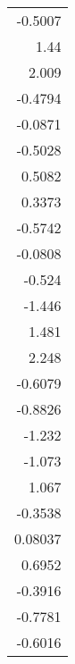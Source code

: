 \documentclass[11pt]{article}
\begin{document}
\begin{tabular}{r}
\toprule
\midrule
-0.5007 \\
1.44 \\
2.009 \\
-0.4794 \\
-0.0871 \\
-0.5028 \\
0.5082 \\
0.3373 \\
-0.5742 \\
-0.0808 \\
-0.524 \\
-1.446 \\
1.481 \\
2.248 \\
-0.6079 \\
-0.8826 \\
-1.232 \\
-1.073 \\
1.067 \\
-0.3538 \\
0.08037 \\
0.6952 \\
-0.3916 \\
-0.7781 \\
-0.6016 \\
\bottomrule
\end{tabular}

    

    
    
    
\end{document}
